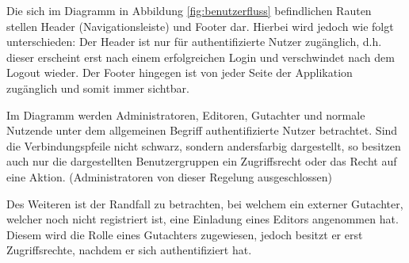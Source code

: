 Die sich im Diagramm in Abbildung \ref{fig:benutzerfluss} befindlichen Rauten stellen Header (Navigationsleiste) und Footer dar.
Hierbei wird jedoch wie folgt unterschieden: Der Header ist nur für authentifizierte Nutzer zugänglich,
d.h. dieser erscheint erst nach einem erfolgreichen Login und verschwindet nach dem Logout wieder.
Der Footer hingegen ist von jeder Seite der Applikation zugänglich und somit immer sichtbar.

Im Diagramm werden Administratoren, Editoren, Gutachter und normale Nutzende unter dem allgemeinen Begriff
authentifizierte Nutzer betrachtet.
Sind die Verbindungspfeile nicht schwarz, sondern andersfarbig dargestellt, so besitzen auch nur die
dargestellten Benutzergruppen ein Zugriffsrecht oder das Recht auf eine Aktion. (Administratoren von dieser Regelung
ausgeschlossen)

Des Weiteren ist der Randfall zu betrachten, bei welchem ein externer Gutachter, welcher noch nicht registriert ist,
eine Einladung eines Editors angenommen hat.
Diesem wird die Rolle eines Gutachters zugewiesen, jedoch besitzt er erst Zugriffsrechte, nachdem er sich
authentifiziert hat.